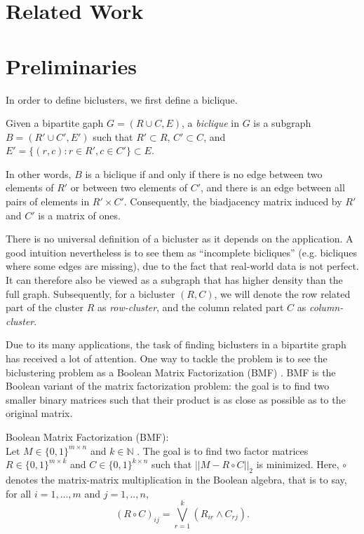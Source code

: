 \documentclass[twoside,leqno,twocolumn]{article}
\theoremstyle{definition}
\begin{document}
\section{Related Work}

\section{Preliminaries}
\noindent In order to define biclusters, we first define a biclique.

Given a bipartite gaph $G = (R \cup C,E)$, a \emph{biclique} in $G$ is a subgraph $B = (R'\cup C',E')$ such that $R' \subset R$, $C' \subset C$, and $E'=\{(r,c) \colon r\in R', c\in C'\}\subset E$.


\noindent In other words, $B$ is a biclique if and only if there is no edge between two elements of $R'$ or between two elements of $C'$, and there is an edge between all pairs of elements in $R' \times C'$. Consequently, the biadjacency matrix induced by $R'$ and $C'$ is a matrix of ones.

\medskip

\noindent There is no universal definition of a bicluster as it depends on the application. A good intuition nevertheless is to see them as ``incomplete bicliques'' (e.g. bicliques where some edges are missing), due to the fact that real-world data is not perfect. It can therefore also be viewed as a subgraph that has higher density than the full graph. Subsequently, for a bicluster $(R,C)$, we will denote the row related part of the cluster $R$ as \emph{row-cluster}, and the column related part $C$ as \emph{column-cluster}.

Due to its many applications, the task of finding biclusters in a bipartite graph has received a lot of attention. One way to tackle the problem is to see the biclustering problem as a Boolean Matrix Factorization (BMF) \cite{BMFrecent}. BMF is the Boolean variant of the matrix factorization problem: the goal is to find two smaller binary matrices such that their product is as close as possible as to the original matrix.

\medskip

\noindent Boolean Matrix Factorization (BMF):\\
Let $M \in \{0,1\}^{m\times n}$ and $k \in \mathbb{N}$ . The goal is to find two factor matrices $R \in \{0,1\}^{m \times k}$ and $C \in \{0,1\}^{k \times n}$ such that $||M - R \circ C||_2$ is minimized. Here, $\circ$ denotes the matrix-matrix multiplication in the Boolean algebra, that is to say, for all $i =1,...,m$ and $j=1,..,n$,
$$(R \circ C)_{ij} = \bigvee_{r=1}^k(R_{ir} \wedge C_{rj}).$$
\end{document}
